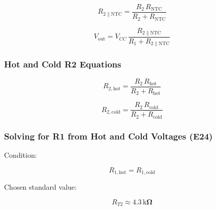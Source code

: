 \documentclass[12pt]{article}
\begin{document}
\begin{equation}
    R_{2\parallel \mathrm{NTC}}
    = \frac{R_2 \, R_{\mathrm{NTC}}}{R_2 + R_{\mathrm{NTC}}}
    \label{equ:R2_parallel_RNTC}
\end{equation}

\begin{equation}
    V_{\mathrm{out}}
    = V_{CC} \,
      \frac{R_{2\parallel \mathrm{NTC}}}
           {R_1 + R_{2\parallel \mathrm{NTC}}}
    \label{equ:Vout}
\end{equation}

\subsubsection{Hot and Cold R2 Equations}

\begin{equation}
    R_{2,\mathrm{hot}}
    = \frac{R_2 \, R_{\mathrm{hot}}}{R_2 + R_{\mathrm{hot}}}
    \label{equ:R2_hot}
\end{equation}

\begin{equation}
    R_{2,\mathrm{cold}}
    = \frac{R_2 \, R_{\mathrm{cold}}}{R_2 + R_{\mathrm{cold}}}
    \label{equ:R2_cold}
\end{equation}

\subsubsection{Solving for R1 from Hot and Cold Voltages (E24)}

Condition:

\begin{equation}
    R_{1,\mathrm{hot}} = R_{1,\mathrm{cold}}
    \label{equ:R1hot_equals_R1cold}
\end{equation}

Chosen standard value:

\begin{equation}
    R_{T2} \approx \mathbf{4.3\,\mathrm{k}\Omega}
    \label{equ:Rt2_4.3k}
\end{equation}

\end{document}
